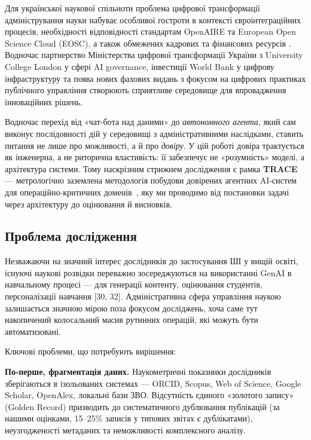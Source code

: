Для української наукової спільноти проблема цифрової трансформації адміністрування науки набуває особливої гостроти в контексті євроінтеграційних процесів, необхідності відповідності стандартам OpenAIRE та European Open Science Cloud (EOSC), а також обмежених кадрових та фінансових ресурсів \cite{OpenAIRE2023GuidelinesCRIS}. Водночас партнерство Міністерства цифрової трансформації України з University College London у сфері AI governance, інвестиції World Bank у цифрову інфраструктуру та поява нових фахових видань з фокусом на цифрових практиках публічного управління створюють сприятливе середовище для впровадження інноваційних рішень.

\iftrace
Водночас перехід від «чат-бота над даними» до \emph{автономного агента}, який сам виконує послідовності дій у середовищі з адміністративними наслідками, ставить питання не лише про можливості, а й про \emph{довіру}. У цій роботі довіра трактується як інженерна, а не риторична властивість: її забезпечує не «розумність» моделі, а архітектура системи. Тому наскрізним стрижнем дослідження є рамка \textbf{TRACE} --- метрологічно заземлена методологія побудови довірених агентних AI-систем для операційно-критичних доменів~\cite{Zabolotnii2026TRACE}, яку ми проводимо від постановки задачі через архітектуру до оцінювання й висновків.
\fi

\subsection*{Проблема дослідження}

Незважаючи на значний інтерес дослідників до застосування ШІ у вищій освіті, існуючі наукові розвідки переважно зосереджуються на використанні GenAI в навчальному процесі --- для генерації контенту, оцінювання студентів, персоналізації навчання [30, 32]. Адміністративна сфера управління наукою залишається значною мірою поза фокусом досліджень, хоча саме тут накопичений колосальний масив рутинних операцій, які можуть бути автоматизовані.

Ключові проблеми, що потребують вирішення:

\textbf{По-перше, фрагментація даних.} Наукометричні показники дослідників зберігаються в ізольованих системах --- ORCID, Scopus, Web of Science, Google Scholar, OpenAlex, локальні бази ЗВО. Відсутність єдиного «золотого запису» (Golden Record) призводить до систематичного дублювання публікацій (за нашими оцінками, 15--25\% записів у типових звітах є дублікатами), неузгодженості метаданих та неможливості комплексного аналізу.

